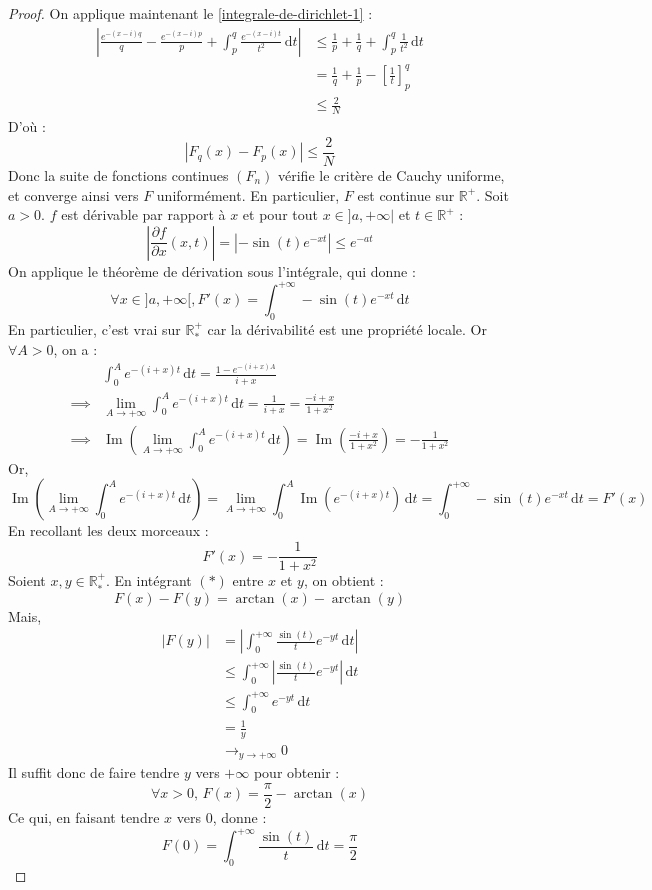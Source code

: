 \begin{proof}
    On applique maintenant le \cref{integrale-de-dirichlet-1} :
    \begin{align*}
      \left| \frac{e^{-(x-i)q}}{q} - \frac{e^{-(x-i)p}}{p} +  \int_p^q \frac{e^{-(x-i)t}}{t^2} \, \mathrm{d}t \right| &\leq \frac{1}{p} + \frac{1}{q} + \int_p^q \frac{1}{t^2} \, \mathrm{d}t \\
      &= \frac{1}{q} + \frac{1}{p} - \left[ \frac{1}{t} \right]^q_p \\
      &\leq \frac{2}{N}
    \end{align*}
    D'où :
    \[ |F_q(x) - F_p(x)| \leq \frac{2}{N} \]
    Donc la suite de fonctions continues $(F_n)$ vérifie le critère de Cauchy uniforme, et converge ainsi vers $F$ uniformément. En particulier, $F$ est continue sur $\mathbb{R}^+$.
    \newpar
    Soit $a > 0$. $f$ est dérivable par rapport à $x$ et pour tout $x \in ]a, +\infty|$ et $t \in \mathbb{R}^+$ :
    \[ \left| \frac{\partial f}{\partial x} (x, t) \right| = |-\sin(t) e^{-xt}| \leq e^{-at} \]
    On applique le théorème de dérivation sous l'intégrale, qui donne :
    \[ \forall x \in ]a, +\infty[, F'(x) = \int_0^{+\infty} -\sin(t) e^{-xt} \, \mathrm{d}t \]
    En particulier, c'est vrai sur $\mathbb{R}^+_*$ car la dérivabilité est une propriété locale. Or $\forall A > 0$, on a :
    \begin{align*}
      & \int_0^A e^{-(i+x)t} \, \mathrm{d}t = \frac{1-e^{-(i+x)A}}{i+x} \\
      \implies & \lim_{A \rightarrow +\infty} \int_0^A e^{-(i+x)t} \, \mathrm{d}t = \frac{1}{i+x} = \frac{-i+x}{1 + x^2} \\
      \implies & \operatorname{Im} \left( \lim_{A \rightarrow +\infty} \int_0^A e^{-(i+x)t} \, \mathrm{d}t \right) = \operatorname{Im} \left( \frac{-i+x}{1 + x^2} \right) = -\frac{1}{1 + x^2}
    \end{align*}
    Or,
    \[ \operatorname{Im} \left( \lim_{A \rightarrow +\infty} \int_0^A e^{-(i+x)t} \, \mathrm{d}t \right) = \lim_{A \rightarrow +\infty} \int_0^A \operatorname{Im} \left( e^{-(i+x)t} \right) \, \mathrm{d}t = \int_0^{+\infty} -\sin(t) e^{-xt} \, \mathrm{d}t = F'(x) \]
    En recollant les deux morceaux :
    \[ F'(x) = -\frac{1}{1+x^2} \tag{$*$} \]
    Soient $x, y \in \mathbb{R}^+_*$. En intégrant $(*)$ entre $x$ et $y$, on obtient :
    \[ F(x) - F(y) = \arctan(x) - \arctan(y) \]
    Mais,
    \begin{align*}
      |F(y)| &= \left| \int_0^{+\infty} \frac{\sin(t)}{t} e^{-yt} \, \mathrm{d}t \right| \\
      &\leq \int_0^{+\infty} \left| \frac{\sin(t)}{t} e^{-yt} \right| \, \mathrm{d}t \\
      &\leq \int_0^{+\infty} e^{-yt} \, \mathrm{d}t \\
      &= \frac{1}{y} \\
      &\longrightarrow_{y \rightarrow +\infty} 0
    \end{align*}
    Il suffit donc de faire tendre $y$ vers $+\infty$ pour obtenir :
    \[ \forall x > 0, \, F(x) = \frac{\pi}{2} - \arctan(x) \]
    Ce qui, en faisant tendre $x$ vers $0$, donne :
    \[ F(0) = \int_0^{+\infty} \frac{\sin(t)}{t} \, \mathrm{d}t = \frac{\pi}{2} \]
  \end{proof}

